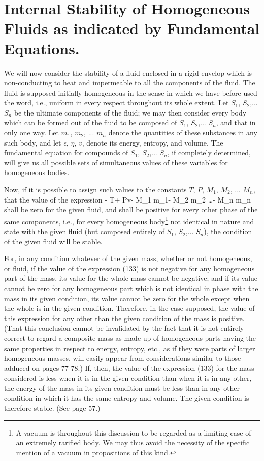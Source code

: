 \documentclass[12pt]{article}
\begin{document}
\section{Internal Stability of Homogeneous Fluids as indicated by Fundamental Equations.}
We will now consider the stability of a fluid enclosed in a rigid envelop which is non-conducting to heat and impermeable to all the components of the fluid. The fluid is supposed initially homogeneous in the sense in which we have before used the word, i.e., uniform in every respect throughout its whole extent. Let $S_1$, $S_2$,... $S_n$ be the ultimate components of the fluid; we may then consider every body which can be formed out of the fluid to be composed of $S_1$, $S_2$,... $S_n$, and that in only one way. Let $m_1$, $m_2$, ... $m_n$ denote the quantities of these substances in any such body, and let $\epsilon$, $\eta$, $v$, denote its energy, entropy, and volume. The fundamental equation for compounds of $S_1$, $S_2$,... $S_n$, if completely determined, will give us all possible sets of simultaneous values of these variables for homogeneous bodies.


Now, if it is possible to assign such values to the constants $T$, $P$,
$M_1$, $M_2$, ... $M_n$, that the value of the expression
\eqs \epsilon - T\eta + Pv- M_1 m_1- M_2 m_2 \dots - M_n m_n \label{133}\eqe 
shall be zero for the given fluid, and shall be positive for every other phase of the same components, i.e., for every homogeneous body\footnote{A vacuum is throughout this discussion to be regarded as a limiting case of an extremely rarified body. We may thus avoid the necessity of the specific mention of a vacuum in propositions of this kind.} not identical in nature and state with the given fluid (but composed entirely of $S_1$, $S_2$,... $S_n$), the condition of the given fluid will be stable.


For, in any condition whatever of the given mass, whether or not homogeneous, or fluid, if the value of the expression (133) is not negative for any homogeneous part of the mass, its value for the whole mass cannot be negative; and if its value cannot be zero for any homogeneous part which is not identical in phase with the mass in its given condition, its value cannot be zero for the whole except when the whole is in the given condition. Therefore, in the case supposed, the value of this expression for any other than the given condition of the mass is positive. (That this conclusion cannot be invalidated by the fact that it is not entirely correct to regard a composite mass as made up of homogeneous parts having the same properties in respect to energy, entropy, etc., as if they were parts of larger homogeneous masses, will easily appear from considerations similar to those adduced on pages 77-78.) If, then, the value of the expression (133) for the mass considered is less when it is in the given condition than when it is in any other, the energy of the mass in its given condition must be less than in any other condition in which it has the same entropy and volume. The given condition is therefore stable. (See page 57.)
\end{document}
